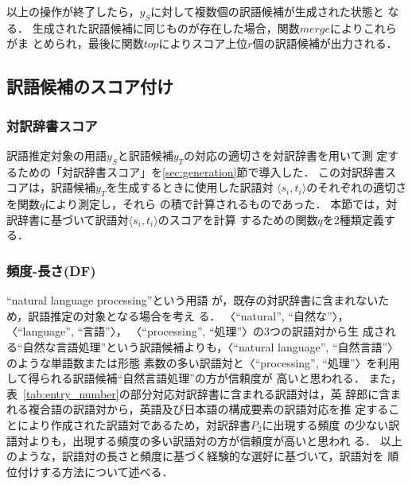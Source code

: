 \documentclass[japanese]{jnlp_1.3a}
\begin{document}
以上の操作が終了したら，$y_S$に対して複数個の訳語候補が生成された状態と
なる．
生成された訳語候補に同じものが存在した場合，関数$merge$によりこれらがま
とめられ，最後に関数$top$によりスコア上位$r$個の訳語候補が出力される．


\subsection{訳語候補のスコア付け}
\label{sec:score_details}

\subsubsection{対訳辞書スコア}
\label{sec:lexicon_score}
訳語推定対象の用語$y_S$と訳語候補$y_T$の対応の適切さを対訳辞書を用いて測
定するための「対訳辞書スコア」を\ref{sec:generation}節で導入した．
この対訳辞書スコアは，訳語候補$y_T$を生成するときに使用した訳語対
$\langle s_i,t_i\rangle$のそれぞれの適切さを関数$q$により測定し，それら
の積で計算されるものであった．
本節では，対訳辞書に基づいて訳語対$\langle s_i,t_i\rangle$のスコアを計算
するための関数$q$を2種類定義する．

\subsubsection*{頻度-長さ(DF)}

``natural language processing''という用語
が，既存の対訳辞書に含まれないため，訳語推定の対象となる場合を考え
 る．
〈``natural'', “自然な”〉，〈``language'', “言語”〉，
〈``processing'', “処理”〉の3つの訳語対から生
成される“自然な言語処理”という訳語候補よりも，〈``natural language'', “自然言語”〉のような単語数または形態
素数の多い訳語対と〈``processing'', “処理”〉を利用して得られる訳語候補“自然言語処理”の方が信頼度が
高いと思われる．
また，表~\ref{tab:entry_number}の部分対応対訳辞書に含まれる訳語対は，英
辞郎に含まれる複合語の訳語対から，英語及び日本語の構成要素の訳語対応を推
定することにより作成された訳語対であるため，対訳辞書$P_2$に出現する頻度
の少ない訳語対よりも，出現する頻度の多い訳語対の方が信頼度が高いと思われ
る．
以上のような，訳語対の長さと頻度に基づく経験的な選好に基づいて，訳語対を
順位付けする方法について述べる．
\end{document}
